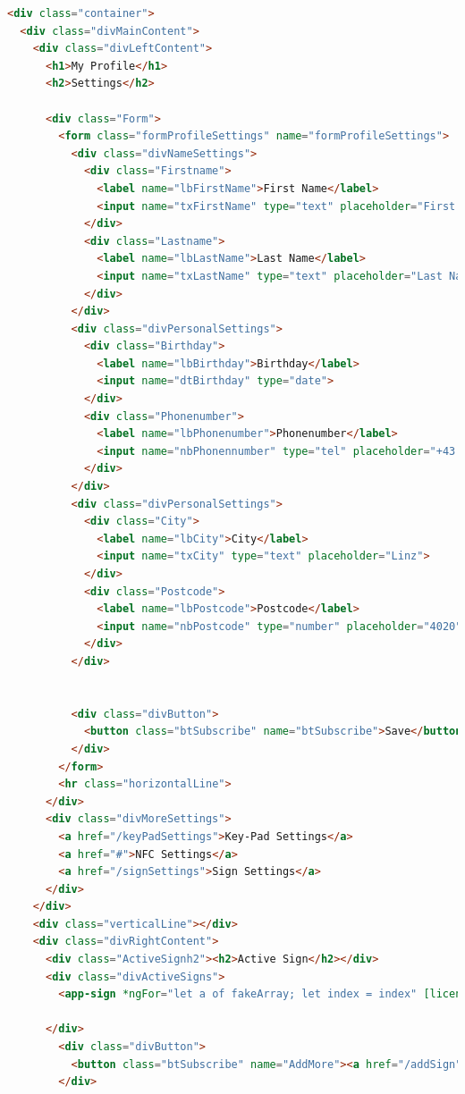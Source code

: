\begin{lstlisting}[language=html, caption=Profil Komponente]
    <div class="container">
  <div class="divMainContent">
    <div class="divLeftContent">
      <h1>My Profile</h1>
      <h2>Settings</h2>

      <div class="Form">
        <form class="formProfileSettings" name="formProfileSettings">
          <div class="divNameSettings">
            <div class="Firstname">
              <label name="lbFirstName">First Name</label>
              <input name="txFirstName" type="text" placeholder="First Name">
            </div>
            <div class="Lastname">
              <label name="lbLastName">Last Name</label>
              <input name="txLastName" type="text" placeholder="Last Name">
            </div>
          </div>
          <div class="divPersonalSettings">
            <div class="Birthday">
              <label name="lbBirthday">Birthday</label>
              <input name="dtBirthday" type="date">
            </div>
            <div class="Phonenumber">
              <label name="lbPhonenumber">Phonenumber</label>
              <input name="nbPhonennumber" type="tel" placeholder="+43 660 123 123 12">
            </div>
          </div>
          <div class="divPersonalSettings">
            <div class="City">
              <label name="lbCity">City</label>
              <input name="txCity" type="text" placeholder="Linz">
            </div>
            <div class="Postcode">
              <label name="lbPostcode">Postcode</label>
              <input name="nbPostcode" type="number" placeholder="4020">
            </div>
          </div>


          <div class="divButton">
            <button class="btSubscribe" name="btSubscribe">Save</button>
          </div>
        </form>
        <hr class="horizontalLine">
      </div>
      <div class="divMoreSettings">
        <a href="/keyPadSettings">Key-Pad Settings</a>
        <a href="#">NFC Settings</a>
        <a href="/signSettings">Sign Settings</a>
      </div>
    </div>
    <div class="verticalLine"></div>
    <div class="divRightContent">
      <div class="ActiveSignh2"><h2>Active Sign</h2></div>
      <div class="divActiveSigns">
        <app-sign *ngFor="let a of fakeArray; let index = index" [licensename]="licensename"></app-sign>

      </div>
        <div class="divButton">
          <button class="btSubscribe" name="AddMore"><a href="/addSign">Add More</a></button>
        </div>


\end{lstlisting}
